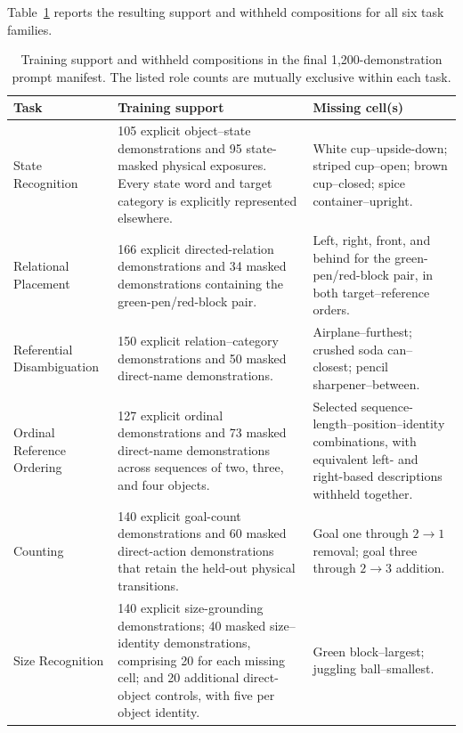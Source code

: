 \documentclass[conference]{IEEEtran}
\begin{document}
Table~\ref{tab:held_out_design} reports the resulting support and withheld compositions for all six task families.

\begin{table}[t]
\centering
\small
\caption{Training support and withheld compositions in the final 1,200-demonstration prompt manifest. The listed role counts are mutually exclusive within each task.}
\label{tab:held_out_design}
\begin{tabular}{p{} p{} p{}}
\toprule
\textbf{Task} & \textbf{Training support} & \textbf{Missing cell(s)} \\
\midrule
State Recognition
& 105 explicit object--state demonstrations and 95 state-masked physical exposures. Every state word and target category is explicitly represented elsewhere.
& White cup--upside-down; striped cup--open; brown cup--closed; spice container--upright. \\

Relational Placement
& 166 explicit directed-relation demonstrations and 34 masked demonstrations containing the green-pen/red-block pair.
& Left, right, front, and behind for the green-pen/red-block pair, in both target--reference orders. \\

Referential Disambiguation
& 150 explicit relation--category demonstrations and 50 masked direct-name demonstrations.
& Airplane--furthest; crushed soda can--closest; pencil sharpener--between. \\

Ordinal Reference Ordering
& 127 explicit ordinal demonstrations and 73 masked direct-name demonstrations across sequences of two, three, and four objects.
& Selected sequence-length--position--identity combinations, with equivalent left- and right-based descriptions withheld together. \\

Counting
& 140 explicit goal-count demonstrations and 60 masked direct-action demonstrations that retain the held-out physical transitions.
& Goal one through $2\rightarrow1$ removal; goal three through $2\rightarrow3$ addition. \\

Size Recognition
& 140 explicit size-grounding demonstrations; 40 masked size--identity demonstrations, comprising 20 for each missing cell; and 20 additional direct-object controls, with five per object identity.
& Green block--largest; juggling ball--smallest. \\
\bottomrule
\end{tabular}
\end{table}
\end{document}
